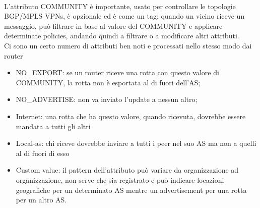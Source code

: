 \documentclass[12pt, oneside]{extbook} %
\begin{document}
\\L'attributo COMMUNITY è importante, usato per controllare le topologie BGP/MPLS VPNs, è opzionale ed è come un tag: quando un vicino riceve un messaggio, può filtrare in base al valore del COMMUNITY e applicare determinate policies, andando quindi a filtrare o a modificare altri attributi.
\\Ci sono un certo numero di attributi ben noti e processati nello stesso modo dai router
\begin{itemize}
    \item NO\_EXPORT: se un router riceve una rotta con questo valore di COMMUNITY, la rotta non è esportata al di fuori dell'AS;
    \item NO\_ADVERTISE: non va inviato l'update a nessun altro;
    \item Internet: una rotta che ha questo valore, quando ricevuta, dovrebbe essere mandata a tutti gli altri
    \item Local-as: chi riceve dovrebbe inviare a tutti i peer nel suo AS ma non a quelli al di fuori di esso
    \item Custom value: il pattern dell'attributo può variare da organizzazione ad organizzazione, non serve che sia registrato e può indicare locazioni geografiche per un determinato AS mentre un advertisement per una rotta per un altro AS. 
\end{itemize}
\end{document}
